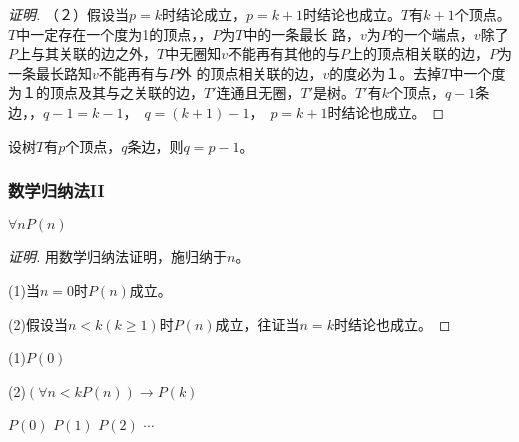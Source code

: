 \documentclass{beamer}
\begin{document}
\begin{CJK*}{UTF8}{gbsn}
\begin{frame}
\begin{proof}[证明]
    （２）假设当$p=k$时结论成立，$p=k+1$时结论也成立。$T$有$k+1$个顶点。\pause $T$中一定存在一个度为1的顶点，，$P$为$T$中的一条最长
    路，\pause$v$为$P$的一个端点，$v$除了$P$上与其关联的边之外，$T$中无圈知$v$不能再有其他的与$P$上的顶点相关联的边，$P$为一条最长路知$v$不能再有与$P$外
    的顶点相关联的边，$v$的度必为１。\pause 去掉$T$中一个度为１的顶点及其与之关联的边，$T'$连通且无圈，$T'$是树。\pause $T'$有$k$个顶点，$q-1$条边，，$q-1 = k - 1$，　$q = (k +1) - 1$，　$p=k+1$时结论也成立。
\end{proof}
\end{frame}
\begin{frame}
    \begin{Thm1}
  设树$T$有$p$个顶点，$q$条边，则$q = p-1$。
  \end{Thm1}\pause
\centering
  \begin{minipage}{0.24\linewidth}
    \centering
\end{minipage}
\end{frame}
\begin{frame}
  \frametitle{数学归纳法II}

  \begin{Thm2} 
  $\forall n P(n)$   
\end{Thm2}\pause
\begin{proof}[证明]
  用数学归纳法证明，施归纳于$n$。\pause

  (1)当$n=0$时$P(n)$成立。\pause

  (2)假设当$n<k(k\geq 1)$时$P(n)$成立，往证当$n=k$时结论也成立。
\end{proof}
\pause
(1)$P(0)$\pause

(2)$(\forall n< k P(n))\to P(k)$

\pause
$P(0)$ \pause $P(1)$ \pause  $P(2)$ \pause $\cdots$
  

\end{frame}
\end{CJK*}
\end{document}
